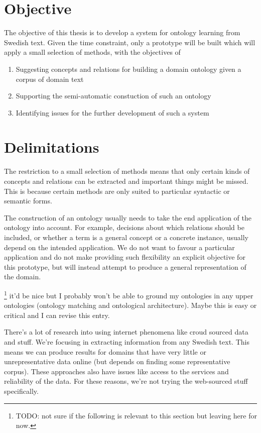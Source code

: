 \documentclass[a4paper]{report}
\newcommand{\todo}[1]{\footnote{{\color{red} TODO: #1}}}
\begin{document}
\section{Objective}

The objective of this thesis is to develop a system for ontology learning from Swedish text.
Given the time constraint, only a prototype will be built which will apply a small selection of methods, with the objectives of
\begin{enumerate}
  \item Suggesting concepts and relations for building a domain ontology given a corpus of domain text
  \item Supporting the semi-automatic constuction of such an ontology
  \item Identifying issues for the further development of such a system
\end{enumerate}

\section{Delimitations}

The restriction to a small selection of methods means that only certain kinds of concepts and relations can be extracted and important things might be missed.
This is because certain methods are only suited to particular syntactic or semantic forms.

The construction of an ontology usually needs to take the end application of the ontology into account.
For example, decisions about which relations should be included, or whether a term is a general concept or a concrete instance, usually depend on the intended application.
We do not want to favour a particular application and do not make providing such flexibility an explicit objective for this prototype, but will instead attempt to produce a general representation of the domain.

\todo{not sure if the following is relevant to this section but leaving here for now.}
it'd be nice but I probably won't be able to ground my ontologies in any upper ontologies (ontology matching and ontological architecture).
Maybe this is easy or critical and I can revise this entry.

There's a lot of research into using internet phenomena like croud sourced data and stuff.
We're focusing in extracting information from any Swedish text.
This means we can produce results for domains that have very little or unrepresentative data online (but depends on finding some representative corpus).
These approaches also have issues like access to the services and reliability of the data.
For these reasons, we're not trying the web-sourced stuff specifically.
\end{document}
